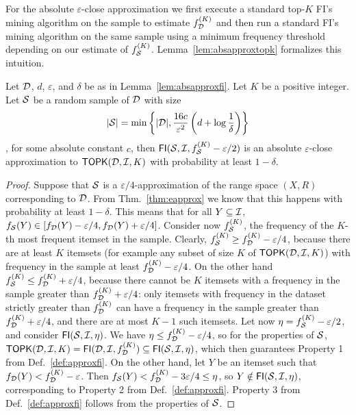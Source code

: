 For the absolute $\varepsilon$-close approximation we first execute a standard
top-$K$ FI's mining algorithm on the sample to estimate $f^{(K)}_{\cal D}$ and then
run a standard FI's mining algorithm on the same sample using a minimum frequency
threshold depending on our estimate of $f_{\cal S}^{(K)}$.
Lemma~\ref{lem:absapproxtopk} formalizes this intuition.

\begin{lemma}\label{lem:absapproxtopk}
  Let ${\cal D}$, $d$, $\varepsilon$, and $\delta$ be as in Lemma~\ref{lem:absapproxfi}.
  Let $K$ be a positive integer. Let ${\cal S}$ be a random sample of ${\cal D}$ with
  size
  \[
  |{\cal S}|=\min\left\{|{\cal D}|,\frac{16c}{\varepsilon^2}\left(d+\log\frac{1}{\delta}\right)\right\}\],
  for some absolute constant $c$, then $\mathsf{FI}({\cal S},{\cal I},f_{\cal S}^{(K)}-\varepsilon/2)$ is an absolute
  $\varepsilon$-close approximation to $\mathsf{TOPK}({\cal D},{\cal I},K)$ with probability at
  least $1-\delta$.
\end{lemma}

\begin{proof}
  Suppose that ${\cal S}$ is a $\varepsilon/4$-approximation of the range
  space $(X,R)$ corresponding to ${\cal D}$. From Thm.~\ref{thm:eapprox} we know that
  this happens with probability at least $1-\delta$. This means that for all
  $Y\subseteq{\cal I}$,
  $f_{\cal S}(Y)\in[f_{\cal D}(Y)-\varepsilon/4,f_{\cal D}(Y)+\varepsilon/4]$.
  Consider now $f_{\cal S}^{(K)}$, the frequency of the $K$-th most frequent itemset
  in the sample. Clearly, $f_{\cal S}^{(K)}\ge f_{\cal D}^{(K)}-\varepsilon/4$,
  because there are at least $K$ itemsets (for example any subset of size $K$ of
  $\mathsf{TOPK}({\cal D},{\cal I},K)$) with frequency in the sample at least
  $f_{\cal D}^{(K)}-\varepsilon/4$. On the other hand $f_{\cal S}^{(K)}\le
  f_{\cal D}^{(K)}+\varepsilon/4$, because there cannot be $K$ itemsets with a
  frequency in the sample greater than $f_{\cal D}^{(K)}+\varepsilon/4$: only
  itemsets with frequency in the dataset strictly greater than $f_{\cal D}^{(K)}$ can
  have a frequency in the sample greater than
  $f_{\cal D}^{(K)}+\varepsilon/4$, and there are at most $K-1$ such
  itemsets. Let now $\eta=f_{\cal S}^{(K)}-\varepsilon/2$, and consider
  $\mathsf{FI}({\cal S},{\cal I},\eta)$. We have $\eta\le f_{\cal D}^{(K)}-\varepsilon/4$, so
  for the properties of ${\cal S}$,
  $\mathsf{TOPK}({\cal D},{\cal I},K)=\mathsf{FI}({\cal D},{\cal I},f_{\cal D}^{(K)})\subseteq\mathsf{FI}({\cal S},{\cal I},\eta)$,
  which then guarantees Property 1 from Def.~\ref{def:approxfi}. On
  the other hand, let $Y$ be an itemset such that
  $f_{\cal D}(Y)<f_{\cal D}^{(K)}-\varepsilon$. Then $f_{\cal S}(Y)<
  f_{\cal D}^{(K)}-3\varepsilon/4\le\eta$, so $Y\notin\mathsf{FI}({\cal S},{\cal I},\eta)$,
  corresponding to Property 2 from Def.~\ref{def:approxfi}. Property 3 from
  Def.~\ref{def:approxfi} follows from the properties of ${\cal S}$.
\end{proof}

